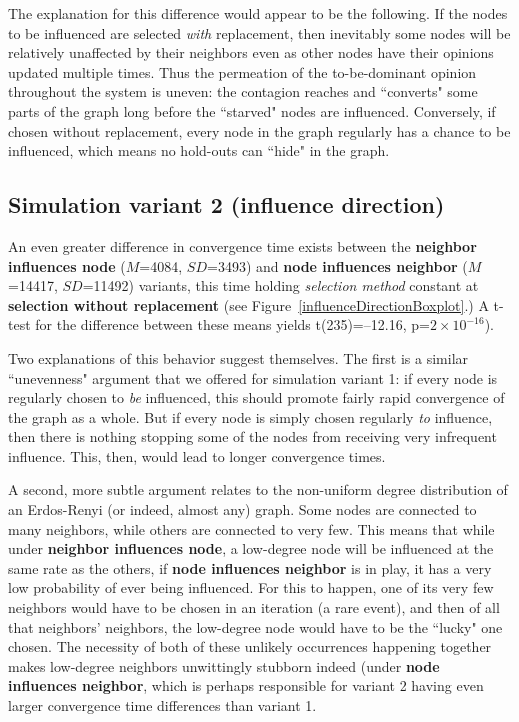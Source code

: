 The explanation for this difference would appear to be the following. If the
nodes to be influenced are selected \textit{with} replacement, then inevitably
some nodes will be relatively unaffected by their neighbors even as other
nodes have their opinions updated multiple times. Thus the permeation of the
to-be-dominant opinion throughout the system is uneven: the contagion reaches
and ``converts" some parts of the graph long before the ``starved" nodes are
influenced. Conversely, if chosen without replacement, every node in the graph
regularly has a chance to be influenced, which means no hold-outs can ``hide"
in the graph.





\subsection{Simulation variant 2 (influence direction)}

An even greater difference in convergence time exists between the
\textbf{neighbor influences node} ($M$=4084, $SD$=3493) and \textbf{node
influences neighbor} ($M$=14417, $SD$=11492) variants, this time holding
\textsl{selection method} constant at \textbf{selection without replacement}
(see Figure~\ref{influenceDirectionBoxplot}.) A t-test for the difference
between these means yields t(235)=--12.16, p=$2\times 10^{-16}$).

Two explanations of this behavior suggest themselves. The first is a similar
``unevenness" argument that we offered for simulation variant 1: if every node
is regularly chosen to \textit{be} influenced, this should promote fairly
rapid convergence of the graph as a whole. But if every node is simply chosen
regularly \textit{to} influence, then there is nothing stopping some of the
nodes from receiving very infrequent influence. This, then, would lead to
longer convergence times.

A second, more subtle argument relates to the non-uniform degree distribution
of an Erdos-Renyi (or indeed, almost any) graph. Some nodes are connected to
many neighbors, while others are connected to very few. This means that while
under \textbf{neighbor influences node}, a low-degree node will be influenced
at the same rate as the others, if \textbf{node influences neighbor} is in
play, it has a very low probability of ever being influenced. For this to
happen, one of its very few neighbors would have to be chosen in an iteration
(a rare event), and then of all that neighbors' neighbors, the low-degree node
would have to be the ``lucky" one chosen. The necessity of both of these
unlikely occurrences happening together makes low-degree neighbors unwittingly
stubborn indeed (under \textbf{node influences neighbor}, which is perhaps
responsible for variant 2 having even larger convergence time differences than
variant 1.


